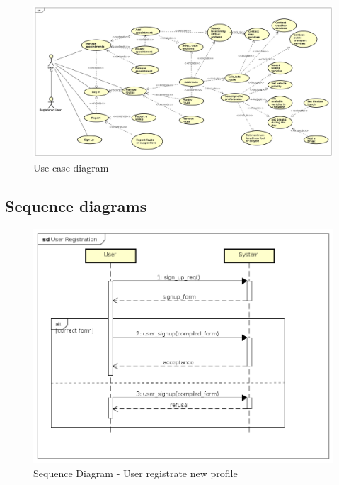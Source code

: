 \begin{figure}
	\centering
	\includegraphics[width=\textwidth]{Images/UseCase_Diagram.png}
	\caption{\label{fig:useCaseDiagram}Use case diagram  }
\end{figure}

\subsection{Sequence diagrams}

\begin{figure} [H]
	\centering
	\includegraphics{Images/SequenceDiagrams/1_User_Registration.png}
	\caption{\label{fig: sequenceDiagram1}Sequence Diagram - User registrate new profile  }
\end{figure}

